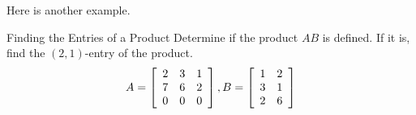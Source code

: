 Here is another example.

\begin{example}{Finding the Entries of a Product}\label{exa:entriesofproduct2}
Determine if the product $AB$ is defined. If it is, find the $\left( 2, 1 \right)$-entry of the product.
\begin{equation*}
A=
\left[
\begin{array}{rrr}
2 & 3 & 1 \\
7 & 6 & 2 \\
0 & 0 & 0
\end{array}
\right],  B =\left[
\begin{array}{rr}
1 & 2 \\
3 & 1 \\
2 & 6
\end{array}
\right] 
\end{equation*}
\end{example}

